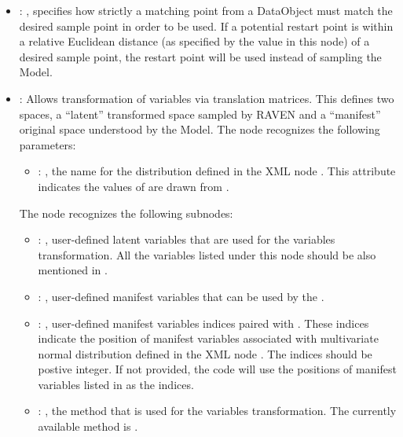 \begin{itemize}
    \item {}: ,
      specifies how strictly a matching point from a  DataObject must match
      the desired sample point in order to be used. If a potential restart point is within a
      relative Euclidean distance (as specified by the value in this node) of a desired sample
      point,               the restart point will be used instead of sampling the Model.

    \item {}:
      Allows transformation of variables via translation matrices. This defines two spaces,
      a ``latent'' transformed space sampled by RAVEN and a ``manifest'' original space understood
      by the Model.
      The  node recognizes the following parameters:
        \begin{itemize}
          \item {}: ,
            the name for the distribution defined in the XML node .
            This attribute indicates the values of  are drawn from
            .
      \end{itemize}

      The  node recognizes the following subnodes:
      \begin{itemize}
        \item {}: ,
          user-defined latent variables that are used for the variables transformation.
          All the variables listed under this node should be also mentioned in .

        \item {}: ,
          user-defined manifest variables that can be used by the .

        \item {}: ,
          user-defined manifest variables indices paired with .
          These indices indicate the position of manifest variables associated with multivariate
          normal               distribution defined in the XML node .
          The indices should be postive integer. If not provided, the code will use the positions
          of manifest variables listed in  as the indices.

        \item {}: ,
          the method that is used for the variables transformation. The currently available method
          is .
      \end{itemize}
  \end{itemize}

